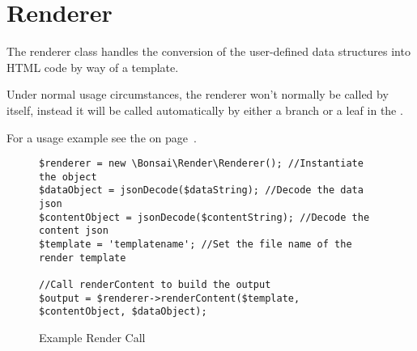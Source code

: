 \documentclass[]{book}
\begin{document}
\begin{figure}[p]
	
	\vspace{12pt}

\end{figure}


\section{Renderer}

The renderer class handles the conversion of the user-defined data structures into HTML code by way of a template.

Under normal usage circumstances, the renderer won't normally be called by itself, instead it will be called automatically by either a branch or a leaf in the .

For a usage example see the  on page~\pageref{ExampleRenderCall}.

\begin{figure}[p]
	\caption{Example Render Call}
	\label{ExampleRenderCall}
	\vspace{12pt}
	\lstset{language=PHP}
	\begin{lstlisting}
$renderer = new \Bonsai\Render\Renderer(); //Instantiate the object
$dataObject = jsonDecode($dataString); //Decode the data json
$contentObject = jsonDecode($contentString); //Decode the content json
$template = 'templatename'; //Set the file name of the render template
 
//Call renderContent to build the output
$output = $renderer->renderContent($template, $contentObject, $dataObject);
	\end{lstlisting}
	
\end{figure}
\end{document}
